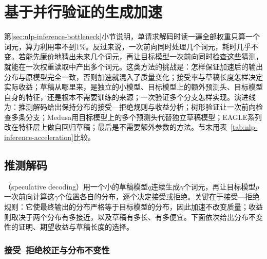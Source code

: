 \section{基于并行验证的生成加速}
\label{sec:nlp-inference-acceleration}

第\ref{sec:nlp-inference-bottleneck}小节说明，单请求解码时读一遍全部权重只算一个词元，算力利用率不到1\%。反过来说，一次前向同时处理几个词元，耗时几乎不变。若能先廉价地猜出未来几个词元，再让目标模型一次前向同时检查这些猜测，就能在一次权重读取中产出多个词元。这类方法的挑战是：怎样保证加速后的输出分布与原模型完全一致，否则加速就混入了质量变化；接受率与草稿长度怎样决定实际收益；草稿从哪里来，是独立的小模型、目标模型上的额外预测头、目标模型自身的特征，还是根本不需要训练的来源；一次验证多个分支怎样实现。演进线为：推测解码给出保持分布的接受—拒绝规则与收益分析；树形验证让一次前向检查多条分支；Medusa用目标模型上的多个预测头代替独立草稿模型；EAGLE系列改在特征层上做自回归草稿；最后是不需要额外参数的方法。节末用表~\ref{tab:nlp-inference-acceleration}比较。

\subsection{推测解码}
\label{sec:nlp-inference-speculative}

（speculative decoding）用一个小的草稿模型$q$连续生成$\gamma$个词元，再让目标模型$p$一次前向计算这$\gamma$个位置各自的分布，逐个决定接受或拒绝。关键在于接受—拒绝规则：它使最终输出的分布严格等于目标模型的分布，因此加速不改变质量；收益则取决于两个分布有多接近，以及草稿有多长、有多便宜。下面依次给出分布不变性的证明、期望收益与草稿长度的选择。

\subsubsection{接受–拒绝校正与分布不变性}
\label{sec:nlp-inference-spec-correction}


